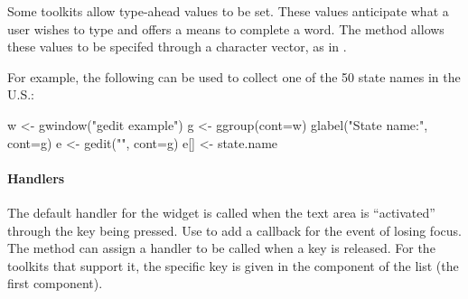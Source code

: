 Some toolkits allow type-ahead values to be set. These values
anticipate what a user wishes to type and offers a means to complete a
word. The \method{[\ASSIGN}{gedit} method allows these values to be
specifed through a character vector, as in .

For example, the following can be used to collect one of the 50 state
names in the U.S.:
\begin{Schunk}
\begin{Sinput}
 w <- gwindow("gedit example") 
 g <- ggroup(cont=w)
 glabel("State name:", cont=g)
 e <- gedit("", cont=g)
 e[] <- state.name
\end{Sinput}
\end{Schunk}

\paragraph{Handlers}
The default handler for the  widget is called when
the text area is ``activated'' through the
 key being pressed. Use  to add a
callback for the event of losing focus. The
 method can assign a handler to be
called when a key is released. For the toolkits that support it, the
specific key is given in the  component of the list  (the first component).


